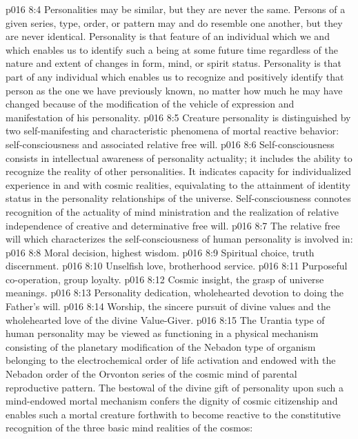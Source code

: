 \vs p016 8:4 Personalities may be similar, but they are never the same. Persons of a given series, type, order, or pattern may and do resemble one another, but they are never identical. Personality is that feature of an individual which we  and which enables us to identify such a being at some future time regardless of the nature and extent of changes in form, mind, or spirit status. Personality is that part of any individual which enables us to recognize and positively identify that person as the one we have previously known, no matter how much he may have changed because of the modification of the vehicle of expression and manifestation of his personality.\plusone
\pc \vs p016 8:5 Creature personality is distinguished by two self\hyp{}manifesting and characteristic phenomena of mortal reactive behavior: self\hyp{}consciousness and associated relative free will.
\vs p016 8:6 Self\hyp{}consciousness consists in intellectual awareness of personality actuality; it includes the ability to recognize the reality of other personalities. It indicates capacity for individualized experience in and with cosmic realities, equivalating to the attainment of identity status in the personality relationships of the universe. Self\hyp{}consciousness connotes recognition of the actuality of mind ministration and the realization of relative independence of creative and determinative free will.
\pc \vs p016 8:7 The relative free will which characterizes the self\hyp{}consciousness of human personality is involved in:
\pc \vs p016 8:8 \bibnobreakspace Moral decision, highest wisdom.
\vs p016 8:9 \bibnobreakspace Spiritual choice, truth discernment.
\vs p016 8:10 \bibnobreakspace Unselfish love, brotherhood service.
\vs p016 8:11 \bibnobreakspace Purposeful co\hyp{}operation, group loyalty.
\vs p016 8:12 \bibnobreakspace Cosmic insight, the grasp of universe meanings.
\vs p016 8:13 \bibnobreakspace Personality dedication, wholehearted devotion to doing the Father’s will.
\vs p016 8:14 \bibnobreakspace Worship, the sincere pursuit of divine values and the wholehearted love of the divine Value\hyp{}Giver.
\pc \vs p016 8:15 The Urantia type of human personality may be viewed as functioning in a physical mechanism consisting of the planetary modification of the Nebadon type of organism belonging to the electrochemical order of life activation and endowed with the Nebadon order of the Orvonton series of the cosmic mind of parental reproductive pattern. The bestowal of the divine gift of personality upon such a mind\hyp{}endowed mortal mechanism confers the dignity of cosmic citizenship and enables such a mortal creature forthwith to become reactive to the constitutive recognition of the three basic mind realities of the cosmos:
